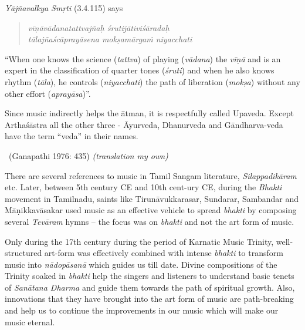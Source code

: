 \vspace{-.2cm}

\textit{Yājñavalkya Smṛti} (3.4.115) says

\begin{verse}
\textit{vīṇāvādanatattvajñaḥ śrutijātiviśāradaḥ} \\ \textit{tālajñaścāprayāsena mokṣamārgaṁ niyacchati} 
\end{verse}

“When one knows the science (\textit{tattva}) of playing (\textit{vādana}) the \textit{vīṇā} and is an expert in the classification of quarter tones (\textit{śruti}) and when he also knows rhythm (\textit{tāla}), he controls (\textit{niyacchati}) the path of liberation (\textit{mokṣa}) without any other effort (\textit{aprayāsa})”.

\begin{myquote}
Since music indirectly helps the ātman, it is respectfully called Upaveda. Except Arthaśāstra all the other three - Āyurveda, Dhanurveda and Gāndharva-veda have the term “veda” in their names. 

~\hfill (Ganapathi 1976: 435) \textit{(translation my own)}
\end{myquote}

There are several references to music in Tamil Sangam literature, \textit{Silappadikāram} etc. Later, between 5th century CE and 10th cent-\break ury CE, during the \textit{Bhakti} movement in Tamilnadu, saints like Tirunāvukkarasar, Sundarar, Sambandar and Māṇikkavāsakar used music as an effective vehicle to spread \textit{bhakti} by composing several \textit{Tevāram} hymns – the focus was on \textit{bhakti} and not the art form of music.

Only during the 17th century during the period of Karnatic Music Trinity, well-structured art-form was effectively combined with intense \textit{bhakti} to transform music into \textit{nādopāsanā} which guides us till date. Divine compositions of the Trinity soaked in \textit{bhakti} help the singers and listeners to understand basic tenets of \textit{Sanātana Dharma} and guide them towards the path of spiritual growth. Also, innovations that they have brought into the art form of music are path-breaking and help us to continue the improvements in our music which will make our music eternal.

